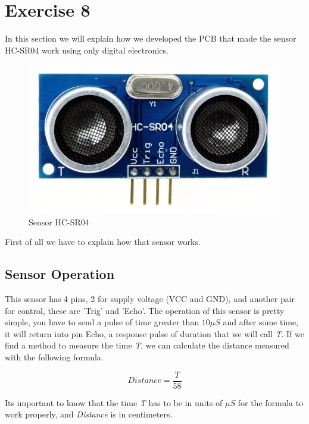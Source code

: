 \pagebreak
\section{\color{olive}Exercise 8}

In this section we will explain how we developed the PCB that made
the sensor HC-SR04 work using only digital electronics. 

\begin{figure}[h!]
\begin{centering}
\includegraphics[scale=0.2]{../Exercise8/Informe/images/HC-SR04}
\par\end{centering}
\caption{\color{cyan}Sensor HC-SR04}
\end{figure}

First of all we have to explain how that sensor works.

\subsection{\color{purple}Sensor Operation}

This sensor has 4 pins, 2 for supply voltage (VCC and GND), and another
pair for control, these are 'Trig' and 'Echo'. The operation of this
sensor is pretty simple, you have to send a pulse of time greater
than $10\mu S$ and after some time, it will return into pin Echo,
a response pulse of duration that we will call \emph{T}. If we find
a method to measure the time \emph{T}, we can calculate the distance
measured with the following formula.

\[
Distance=\frac{T}{58}
\]

Its important to know that the time \emph{T }has to be in units of
$\mu S$ for the formula to work properly, and \emph{Distance }is
in centimeters.

